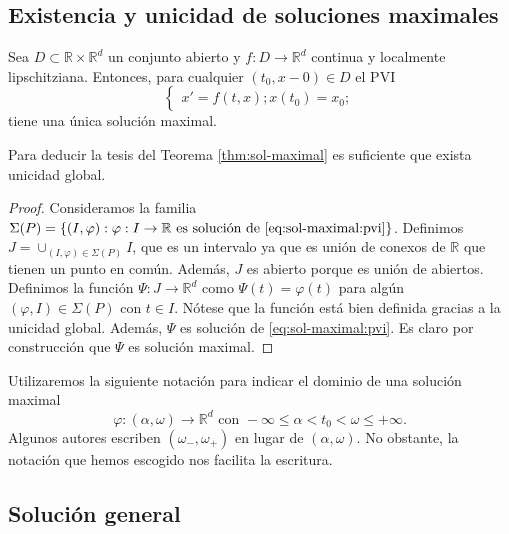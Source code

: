 \documentclass{article}
\begin{document}
\subsection{Existencia y unicidad de soluciones maximales}

\begin{thm} \label{thm:sol-maximal} Sea $D \subset \mathbb{R} \times \mathbb{R}^d$ un conjunto
  abierto y $f : D \to \mathbb{R}^d$ continua y localmente lipschitziana. Entonces, para cualquier
  $(t_0, x-0) \in D$ el PVI
  \begin{equation}
    \label{eq:sol-maximal:pvi}
    \begin{cases}
      x' = f(t,x); x(t_0) = x_0;
    \end{cases}
  \end{equation}
    tiene una única solución maximal.
\end{thm}

\begin{rem}
  Para deducir la tesis del Teorema \ref{thm:sol-maximal} es suficiente que exista unicidad
  global.
\end{rem}

\begin{proof}
  Consideramos la familia
  $\Sigma(P) = \{(I, \varphi) : \varphi:I \to \mathbb{R} \text{ es solución de
    \eqref{eq:sol-maximal:pvi}}\}$. Definimos $J = \cup_{(I, \varphi) \in \Sigma(P)} I$, que es un
intervalo ya que es unión de conexos de $\mathbb{R}$ que tienen un punto en común. Además, $J$ es abierto porque es unión de abiertos. Definimos la función $\Psi : J \to \mathbb{R}^d$ como $\Psi(t) = \varphi(t)$ para algún $(\varphi, I) \in \Sigma(P)$ con $t \in I$. Nótese que la función está bien definida gracias a la unicidad global. Además, $\Psi$ es solución de \eqref{eq:sol-maximal:pvi}. Es claro por construcción que $\Psi$ es solución maximal.
\end{proof}

Utilizaremos la siguiente notación para indicar el dominio de una solución maximal
\[\varphi: (\alpha, \omega) \to \mathbb{R}^d \text{ con } -\infty \leq \alpha < t_0 < \omega \leq +\infty.\]
Algunos autores escriben $(\omega_-, \omega_+)$ en lugar de $(\alpha, \omega)$. No obstante, la notación que hemos escogido nos facilita la escritura.

\subsection{Solución general}
\end{document}
